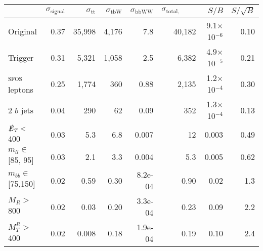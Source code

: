 \begin{tabular}{lrrrrrrr}
\toprule
{} &  $\sigma_\text{signal}$ &  $\sigma_\text{tt}$ &  $\sigma_\text{tbW}$ &  $\sigma_\text{bbWW}$ &  $\sigma_\text{total, background}$ &   $S/B$ &  $S/\sqrt{B}$ \\
\midrule
Original            & 0.37 & 35,998 & 4,176 & 7.8     & 40,182 & 9.1$\times$ 10$^{-6}$ & 0.10 \\
Trigger             & 0.31 & 5,321  & 1,058 & 2.5     & 6,382  & 4.9$\times$ 10$^{-5}$ & 0.21 \\
\textsc{sfos} leptons        & 0.25 & 1,774  & 360   & 0.88    & 2,135  & 1.2$\times$ 10$^{-4}$ & 0.30 \\
2 $b$ jets          & 0.04 & 290    & 62    & 0.09    & 352    & 1.3$\times$ 10$^{-4}$ & 0.13 \\
$\slashed{E}_T <$ 400         & 0.03 & 5.3    & 6.8   & 0.007   & 12     & 0.003               & 0.49 \\
$m_{ll} \in$ [85, 95]  & 0.03 & 2.1    & 3.3   & 0.004   & 5.3    & 0.005               & 0.62 \\
$m_{bb}\in$ [75,150] & 0.02 & 0.59   & 0.30  & 8.2e-04 & 0.90   & 0.02                & 1.3 \\
$M_{R} >$ 800       & 0.02 & 0.03   & 0.20  & 3.3e-04 & 0.23   & 0.09                & 2.2 \\
$M_{T}^{R} >$ 400   & 0.02 & 0.008  & 0.18  & 1.9e-04 & 0.19   & 0.10                & 2.4 \\
\bottomrule
\end{tabular}
